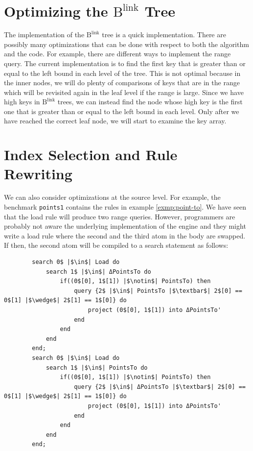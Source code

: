 \documentclass[twoside,11pt]{report}
\theoremstyle{definition}
\begin{document}
\section{Optimizing the $\text{B}^{\text{link}}$ Tree}

The implementation of the $\text{B}^{\text{link}}$ tree is a quick implementation. There are possibly many optimizations that can be done with respect to both the algorithm and the code. For example, there are different ways to implement the range query. The current implementation is to find the first key that is greater than or equal to the left bound in each level of the tree. This is not optimal because in the inner nodes, we will do plenty of comparisons of keys that are in the range which will be revisited again in the leaf level if the range is large. Since we have high keys in $\text{B}^{\text{link}}$ trees, we can instead find the node whose high key is the first one that is greater than or equal to the left bound in each level. Only after we have reached the correct leaf node, we will start to examine the key array.

\section{Index Selection and Rule Rewriting}

We can also consider optimizations at the source level. For example, the benchmark \texttt{points1} contains the rules in example \ref{exmp:point-to}. We have seen that the load rule will produce two range queries. However, programmers are probably not aware the underlying implementation of the engine and they might write a load rule where the second and the third atom in the body are swapped. If then, the second atom will be compiled to a search statement as follows:

\begin{verbatim}
        search 0$ |$\in$| Load do
            search 1$ |$\in$| ΔPointsTo do
                if((0$[0], 1$[1]) |$\notin$| PointsTo) then
                    query {2$ |$\in$| PointsTo |$\textbar$| 2$[0] == 0$[1] |$\wedge$| 2$[1] == 1$[0]} do
                        project (0$[0], 1$[1]) into ΔPointsTo'
                    end
                end
            end
        end;
        search 0$ |$\in$| Load do
            search 1$ |$\in$| PointsTo do
                if((0$[0], 1$[1]) |$\notin$| PointsTo) then
                    query {2$ |$\in$| ΔPointsTo |$\textbar$| 2$[0] == 0$[1] |$\wedge$| 2$[1] == 1$[0]} do
                        project (0$[0], 1$[1]) into ΔPointsTo'
                    end
                end
            end
        end;
\end{verbatim}
\end{document}
